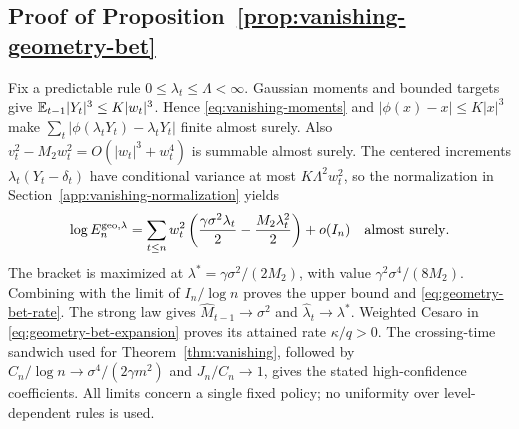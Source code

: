 \subsection{Proof of Proposition~\ref{prop:vanishing-geometry-bet}}
Fix a predictable rule $0\le\lambda_t\le\Lambda<\infty$.
Gaussian moments and bounded targets give
$\mathbb E_{t-1}|Y_t|^3\le K|w_t|^3$. Hence
\eqref{eq:vanishing-moments} and $|\phi(x)-x|\le K|x|^3$ make
$\sum_t|\phi(\lambda_tY_t)-\lambda_tY_t|$ finite almost surely.
Also $v_t^2-M_2w_t^2=O(|w_t|^3+w_t^4)$ is summable almost surely.
The centered increments $\lambda_t(Y_t-\delta_t)$ have conditional variance
at most $K\Lambda^2w_t^2$, so the normalization in
Section~\ref{app:vanishing-normalization} yields
\begin{equation}
 \log E_n^{\mathrm{geo},\lambda}
 =\sum_{t\le n}w_t^2
       \left(\frac{\gamma\sigma^2\lambda_t}{2}
                         -\frac{M_2\lambda_t^2}{2}\right)+o(I_n)
 \quad\hbox{almost surely}.
 \label{eq:geometry-bet-expansion}
\end{equation}
The bracket is maximized at $\lambda^*=\gamma\sigma^2/(2M_2)$, with value
$\gamma^2\sigma^4/(8M_2)$. Combining with the limit of $I_n/\log n$
proves the upper bound and \eqref{eq:geometry-bet-rate}. The strong law gives
$\widehat M_{t-1}\to\sigma^2$ and
$\widehat\lambda_t\to\lambda^*$. Weighted Cesaro in
\eqref{eq:geometry-bet-expansion} proves its attained rate $\kappa/q>0$.
The crossing-time sandwich used for Theorem~\ref{thm:vanishing}, followed by
$C_n/\log n\to\sigma^4/(2\gamma m^2)$ and $J_n/C_n\to1$,
gives the stated high-confidence coefficients. All limits concern a single
fixed policy; no uniformity over level-dependent rules is used.
